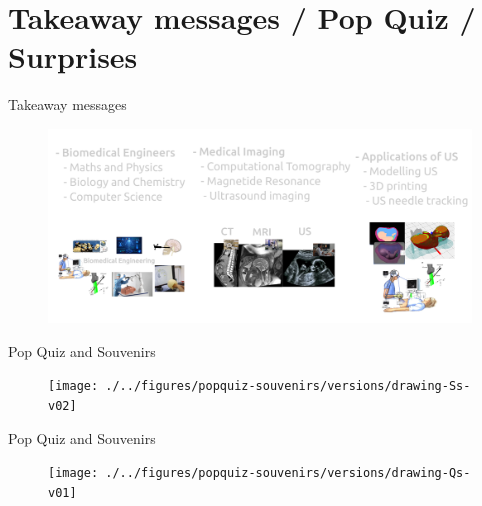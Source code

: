 \section{Takeaway messages / Pop Quiz / Surprises }



{
\begin{frame}{Takeaway messages}
  \begin{figure}
  \centering
  \includegraphics[width=1.0\textwidth]{./../figures/takeaways/versions/drawing-v03}
  \end{figure}

\end{frame}
}

{
\begin{frame}{Pop Quiz and Souvenirs}
  \begin{figure}
  \centering
  \texttt{[image: ./../figures/popquiz-souvenirs/versions/drawing-Ss-v02]}
  \end{figure}

\end{frame}
}


{
\begin{frame}{Pop Quiz and Souvenirs}
  \begin{figure}
  \centering
  \texttt{[image: ./../figures/popquiz-souvenirs/versions/drawing-Qs-v01]}
  \end{figure}

\end{frame}
}


